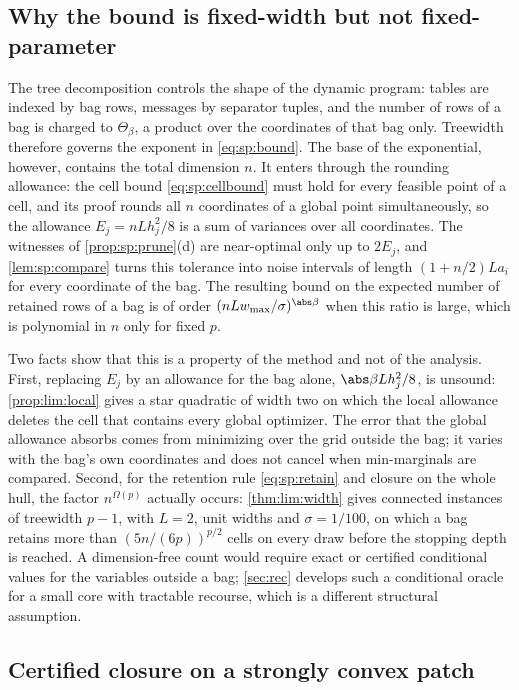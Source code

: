 \subsection{Why the bound is fixed-width but not fixed-parameter}\label{sec:sp:width}

The tree decomposition controls the shape of the dynamic program: tables
are indexed by bag rows, messages by separator tuples, and the number of
rows of a bag is charged to $\Theta_\beta$, a product over the coordinates
of that bag only. Treewidth therefore governs the exponent in
\eqref{eq:sp:bound}. The base of the exponential, however, contains the
total dimension $n$. It enters through the rounding allowance: the cell bound
\eqref{eq:sp:cellbound} must hold for every feasible point of a cell, and
its proof rounds all $n$ coordinates of a global point simultaneously, so
the allowance $E_j=nLh_j^2/8$ is a sum of variances over all coordinates.
The witnesses of \cref{prop:sp:prune}(d) are near-optimal only up to
$2E_j$, and \cref{lem:sp:compare} turns this tolerance into noise intervals
of length $(1+n/2)La_i$ for every coordinate of the bag. The resulting bound
on the expected number of retained rows of a bag is of order
$(nLw_{\max}/\sigma)^{\abs\beta}$ when this ratio is large, which is polynomial
in $n$ only for fixed $p$.

Two facts show that this is a property of the method and not of the
analysis. First, replacing $E_j$ by an allowance for the bag alone,
$\abs\beta Lh_j^2/8$, is unsound: \cref{prop:lim:local} gives a star
quadratic of width two on which the local allowance deletes the cell that
contains every global optimizer. The error that the global allowance absorbs
comes from minimizing over the grid outside the bag; it varies with the
bag's own coordinates and does not cancel when min-marginals are compared.
Second, for the retention rule \eqref{eq:sp:retain} and closure on the whole
hull, the factor $n^{\Omega(p)}$ actually occurs: \cref{thm:lim:width} gives
connected instances of treewidth $p-1$, with $L=2$, unit widths and
$\sigma=1/100$, on which a bag retains more than $(5n/(6p))^{p/2}$ cells on
every draw before the stopping depth is reached. A dimension-free count would
require exact or certified conditional values for the variables outside a
bag; \cref{sec:rec} develops such a conditional oracle for a small core with
tractable recourse, which is a different structural assumption.

\subsection{Certified closure on a strongly convex patch}\label{sec:sp:closure}

